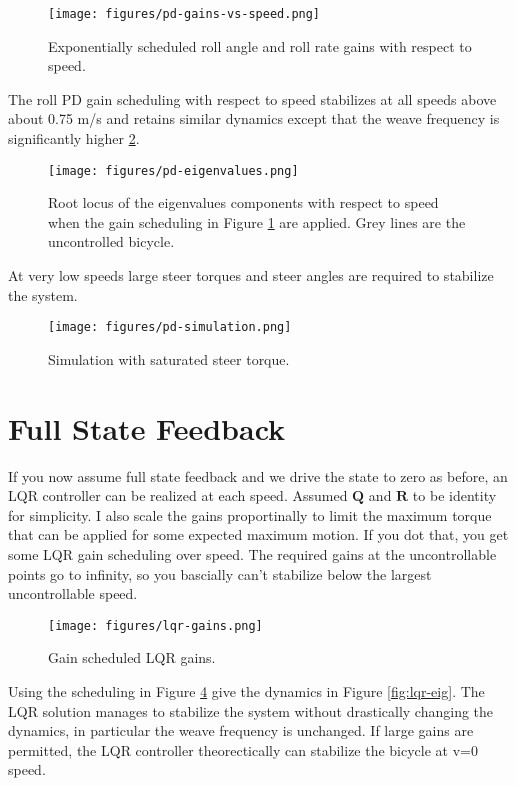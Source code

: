 \documentclass[12pt]{article}
\begin{document}
\begin{figure}
  \centering
  \texttt{[image: figures/pd-gains-vs-speed.png]}
  \caption{Exponentially scheduled roll angle and roll rate gains with respect
  to speed.}
  \label{fig:pd-gains-vs-speed}
\end{figure}

The roll PD gain scheduling with respect to speed stabilizes at all speeds
above about 0.75 m/s and retains similar dynamics except that the weave
frequency is significantly higher \ref{fig:pd-eigenvalues}.

\begin{figure}
  \centering
  \texttt{[image: figures/pd-eigenvalues.png]}
  \caption{Root locus of the eigenvalues components with respect to speed when
  the gain scheduling in Figure \ref{fig:pd-gains-vs-speed} are applied. Grey
  lines are the uncontrolled bicycle.}
  \label{fig:pd-eigenvalues}
\end{figure}

At very low speeds large steer torques and steer angles are required to
stabilize the system.

\begin{figure}
  \centering
  \texttt{[image: figures/pd-simulation.png]}
  \caption{Simulation with saturated steer torque.}
  \label{fig:pd_simulation}
\end{figure}

\section{Full State Feedback}

If you now assume full state feedback and we drive the state to zero as before,
an LQR controller can be realized at each speed. Assumed \(\mathbf{Q}\) and
\(\mathbf{R}\) to be identity for simplicity. I also scale the gains
proportinally to limit the maximum torque that can be applied for some expected
maximum motion. If you dot that, you get some LQR gain scheduling over speed.
The required gains at the uncontrollable points go to infinity, so you
bascially can't stabilize below the largest uncontrollable speed.

\begin{figure}
  \centering
  \texttt{[image: figures/lqr-gains.png]}
  \caption{Gain scheduled LQR gains.}
  \label{fig:lqr-gains}
\end{figure}

Using the scheduling in Figure \ref{fig:lqr-gains} give the dynamics in Figure
\ref{fig:lqr-eig}. The LQR solution manages to stabilize the system without
drastically changing the dynamics, in particular the weave frequency is
unchanged. If large gains are permitted, the LQR controller theorectically can
stabilize the bicycle at v=0 speed.
\end{document}
